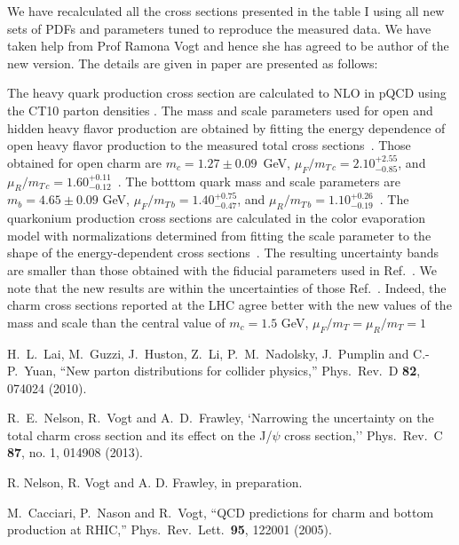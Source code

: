 \documentclass[aps,prc,preprint,superscriptaddress,showpacs,showkeys]{revtex4-1}
\begin{document}
\begin{enumerate}
{  We have recalculated all the cross sections presented in the table I using all new sets of PDFs 
  and parameters tuned to reproduce the measured data. We have taken help from Prof Ramona Vogt and hence 
  she has agreed to be author of the new version. The details are given in paper are presented as follows: 
  
  The heavy quark production cross section are calculated to NLO in pQCD  
  using the CT10 parton densities \cite{Lai:2010vv}. The mass and scale parameters used 
  for open and hidden heavy flavor production are obtained by fitting the energy dependence 
  of open heavy flavor production to the measured total cross sections~\cite{Nelson:2012bc,Nelson:Future}.
  Those obtained for open charm are $m_c = 1.27 \pm 0.09$~GeV,
  $\mu_F/m_{T\,c} = 2.10 ^{+2.55}_{-0.85}$, and $\mu_R/m_{T\, c} = 1.60 ^{+0.11}_{-0.12}$~\cite{Nelson:2012bc}. 
  The botttom quark mass and scale parameters are $m_b = 4.65 \pm 0.09$ GeV,
  $\mu_F/m_{T\, b} = 1.40^{+0.75}_{-0.47}$, and $\mu_R/m_{T\, b} = 1.10^{+0.26}_{-0.19}$~\cite{Nelson:Future}.
  The quarkonium production cross sections are calculated in the color evaporation model with
  normalizations determined from fitting the scale parameter to the shape of the energy-dependent
  cross sections~\cite{Nelson:2012bc,Nelson:Future}. The resulting uncertainty bands are smaller 
  than those obtained with the fiducial parameters used in Ref.~\cite{Cacciari:2005rk}.
  We note that the new results are within the uncertainties of those Ref.~\cite{Cacciari:2005rk}.  
  Indeed, the charm cross sections reported at the LHC agree
  better with the new values of the mass and scale than the central value of $m_c = 1.5$ GeV,
  $\mu_F/m_T = \mu_R/m_T = 1$


  H.~L.~Lai, M.~Guzzi, J.~Huston, Z.~Li, P.~M.~Nadolsky, J.~Pumplin and C.-P.~Yuan,
  ``New parton distributions for collider physics,''
  Phys.\ Rev.\ D {\bf 82}, 074024 (2010).
  



  R.~E.~Nelson, R.~Vogt and A.~D.~Frawley,
  `Narrowing the uncertainty on the total charm cross section and its effect on the J/$\psi$ cross section,''
  Phys.\ Rev.\ C {\bf 87}, no. 1, 014908 (2013).
  

  
  R. Nelson, R. Vogt and A. D. Frawley, in preparation.
  
  
  M.~Cacciari, P.~Nason and R.~Vogt,
  ``QCD predictions for charm and bottom production at RHIC,''
  Phys.\ Rev.\ Lett.\  {\bf 95}, 122001 (2005).



}
\end{enumerate}
\end{document}
